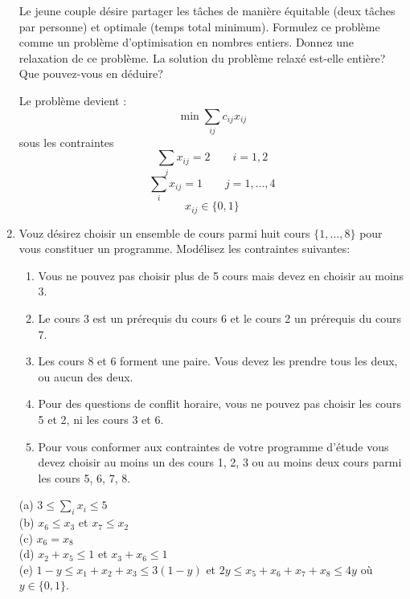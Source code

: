 \begin{enumerate}
    Le jeune couple  désire partager les tâches de manière équitable (deux tâches par personne) et optimale (temps total minimum). Formulez
    ce problème comme un problème d'optimisation en nombres entiers. Donnez une relaxation de ce problème. La solution du problème
    relaxé est-elle entière? Que pouvez-vous en déduire?


    \begin{solution}
      Le problème devient : \\
      $$ \min \sum_{ij}c_{ij}x_{ij}$$
      sous les contraintes \\
      $$ \sum_{j} x_{ij} = 2 \qquad i = 1,2$$
       $$ \sum_{i} x_{ij} = 1\qquad j = 1, \dots,4$$
       $$x_{ij} \in \lbrace 0,1\rbrace$$
    \end{solution}

  \item Vouz désirez choisir un ensemble de cours parmi huit cours $\{1, \ldots,
    8 \}$ pour vous constituer un programme. Modélisez les contraintes
    suivantes:

    \begin{enumerate}
      \item Vous ne pouvez pas choisir plus de 5 cours mais devez en choisir au
        moins 3.
      \item Le cours 3 est un prérequis du cours 6 et le cours 2 un prérequis
        du cours 7.
      \item Les cours 8 et 6 forment une paire. Vous devez les prendre tous les
        deux, ou aucun des deux.
      \item Pour des questions de conflit horaire, vous ne pouvez pas choisir
        les cours 5 et 2, ni les cours 3 et 6.
      \item Pour vous conformer aux contraintes de votre programme d'étude vous devez choisir au moins un des cours
        1, 2, 3 ou au moins deux cours parmi les cours 5, 6, 7, 8.
    \end{enumerate}


    \begin{solution}
       (a) $3 \le \sum_{i} x_{i} \le 5$ \\
       \newline
       (b) $x_{6} \le x_{3}$ et $x_{7} \le x_{2}$ \\
        \newline
       (c) $x_{6} = x_{8}$ \\
        \newline
       (d) $x_{2} + x_{5} \le 1$ et $x_{3} + x_{6} \le 1$\\
        \newline
      (e) $ 1-y \le x_{1} + x_{2} + x_{3} \le 3(1-y)$ et $ 2y \le x_{5} + x_{6} + x_{7} + x_{8} \le 4y$ où $y \in \lbrace 0,1\rbrace$.
    \end{solution}


\end{enumerate}
